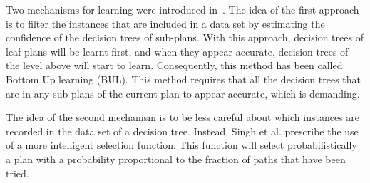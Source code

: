 \documentclass{article}
\begin{document}
Two mechanisms for learning were introduced
in~\cite{Singh10:Learning}. The idea of the first approach is to
filter the instances that are included in a data set by estimating the
confidence of the decision trees of sub-plans. With this approach,
decision trees of leaf plans will be learnt first, and when they
appear accurate, decision trees of the level above will start to
learn. Consequently, this method has been called Bottom Up learning
(BUL). This method requires that all the decision trees that are in
any sub-plans of the current plan to appear accurate, which is
demanding.

The idea of the second mechanism is to be less careful about which
instances are recorded in the data set of a decision tree. Instead,
Singh et al. prescribe the use of a more intelligent selection
function. This function will select probabilistically a plan with a
probability proportional to the fraction of paths that have been
tried.




\end{document}
